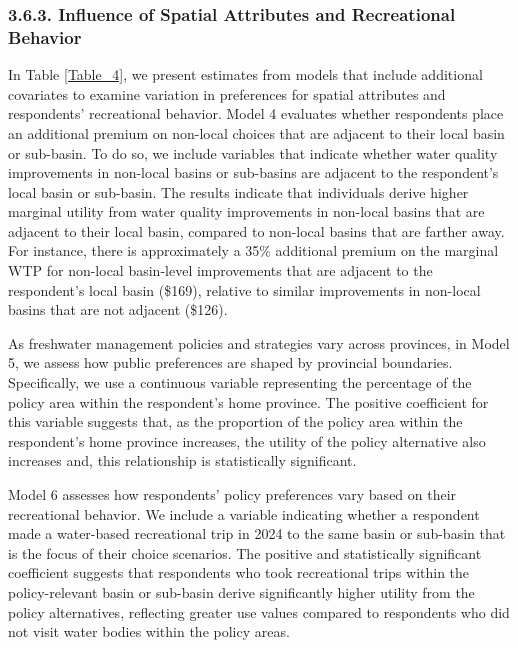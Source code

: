 \documentclass[12pt]{article}
\begin{document}
\subsubsection*{3.6.3. Influence of Spatial Attributes and Recreational Behavior}

In Table \ref{Table_4}, we present estimates from models that include additional covariates to examine variation in preferences for 
spatial attributes and respondents’ recreational behavior. Model 4 evaluates whether respondents place an additional premium on 
non-local choices that are adjacent to their local basin or sub-basin. To do so, we include variables that indicate whether water 
quality improvements in non-local basins or sub-basins are adjacent to the respondent’s local basin or sub-basin. The results 
indicate that individuals derive higher marginal utility from water quality improvements in non-local basins that are adjacent 
to their local basin, compared to non-local basins that are farther away. For instance, there is approximately a 35\% additional 
premium on the marginal WTP for non-local basin-level improvements that are adjacent to the respondent’s local basin (\$169), 
relative to similar improvements in non-local basins that are not adjacent (\$126).


As freshwater management policies and strategies vary across provinces, in Model 5, we assess how public preferences are shaped by provincial 
boundaries. Specifically, we use a continuous variable representing the percentage of the policy area within the respondent’s home province. 
The positive coefficient for this variable suggests that, as the proportion of the policy area within the respondent’s home province increases, 
the utility of the policy alternative also increases and, this relationship is statistically significant.

Model 6 assesses how respondents' policy preferences vary based on their recreational behavior. We include a variable indicating whether a 
respondent made a water-based recreational trip in 2024 to the same basin or sub-basin that is the focus of their choice scenarios. The positive 
and statistically significant coefficient suggests that respondents who took recreational trips within the policy-relevant basin or sub-basin 
derive significantly higher utility from the policy alternatives, reflecting greater use values compared to respondents who did not visit water 
bodies within the policy areas.

\end{document}
